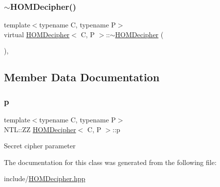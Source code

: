 \mbox{\label{classHOMDecipher_ae9f58f01719a48d5bbd41824181e181a}} 
\subsubsection{\texorpdfstring{$\sim$\+H\+O\+M\+Decipher()}{~HOMDecipher()}}
{\footnotesize\ttfamily template$<$typename C, typename P$>$ \\
virtual \hyperlink{classHOMDecipher}{H\+O\+M\+Decipher}$<$ C, P $>$\+::$\sim$\hyperlink{classHOMDecipher}{H\+O\+M\+Decipher} (\begin{DoxyParamCaption}{ }\end{DoxyParamCaption})\hspace{0.3cm}{\ttfamily [inline]}, {\ttfamily [virtual]}}



\subsection{Member Data Documentation}
\mbox{\label{classHOMDecipher_a434f26bd73b3f9ee8bf999278d78a26c}} 
\subsubsection{\texorpdfstring{p}{p}}
{\footnotesize\ttfamily template$<$typename C, typename P$>$ \\
N\+T\+L\+::\+ZZ \hyperlink{classHOMDecipher}{H\+O\+M\+Decipher}$<$ C, P $>$\+::p\hspace{0.3cm}{\ttfamily [protected]}}

Secret cipher parameter 

The documentation for this class was generated from the following file\+:\begin{DoxyCompactItemize}
\item 
include/\hyperlink{HOMDecipher_8hpp}{H\+O\+M\+Decipher.\+hpp}\end{DoxyCompactItemize}
